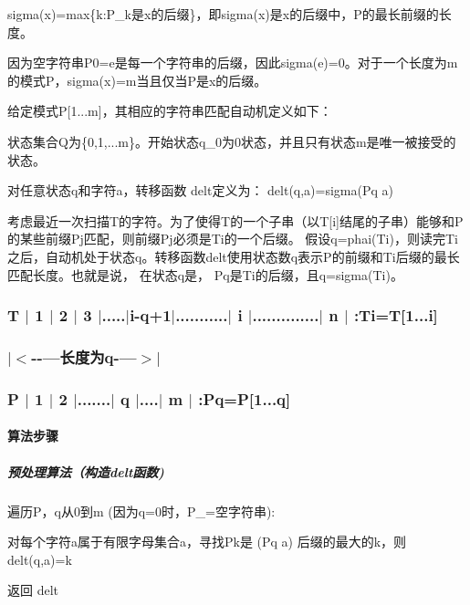 \begin{DoxyItemize}
\item sigma(x)=max\{k\+:P\+\_\+k是x的后缀\}，即sigma(x)是x的后缀中，\+P的最长前缀的长度。
\end{DoxyItemize}

因为空字符串\+P0=e是每一个字符串的后缀，因此sigma(e)=0。对于一个长度为m的模式\+P，sigma(x)=m当且仅当\+P是x的后缀。

给定模式\+P\mbox{[}1...m\mbox{]}，其相应的字符串匹配自动机定义如下：


\begin{DoxyItemize}
\item 状态集合\+Q为\{0,1,...m\}。开始状态q\+\_\+0为0状态，并且只有状态m是唯一被接受的状态。
\item 对任意状态q和字符a，转移函数 delt定义为： delt(q,a)=sigma(\+Pq a)
\end{DoxyItemize}

考虑最近一次扫描\+T的字符。为了使得\+T的一个子串（以\+T\mbox{[}i\mbox{]}结尾的子串）能够和\+P的某些前缀\+Pj匹配，则前缀\+Pj必须是\+Ti的一个后缀。 假设q=phai(\+Ti)，则读完\+Ti之后，自动机处于状态q。转移函数delt使用状态数q表示\+P的前缀和\+Ti后缀的最长匹配长度。也就是说， 在状态q是， Pq是\+Ti的后缀，且q=sigma(\+Ti)。 

 \subsubsection*{T $\vert$ 1 $\vert$ 2 $\vert$ 3 $\vert$.....$\vert$i-\/q+1$\vert$...........$\vert$ i $\vert$..............$\vert$ n $\vert$ \+:Ti=T\mbox{[}1...i\mbox{]} }

\subsubsection*{$\vert$$<$-\/-\/---长度为q-\/---$>$$\vert$ }

\subsubsection*{P $\vert$ 1 $\vert$ 2 $\vert$.......$\vert$ q $\vert$....$\vert$ m $\vert$ \+:Pq=P\mbox{[}1...q\mbox{]} }

\paragraph*{算法步骤}

\subparagraph*{预处理算法（构造delt函数)}


\begin{DoxyItemize}
\item 遍历\+P，q从0到m (因为q=0时，\+P\+\_=空字符串)\+:
\begin{DoxyItemize}
\item 对每个字符a属于有限字母集合a，寻找\+Pk是 (Pq a) 后缀的最大的k，则 delt(q,a)=k
\end{DoxyItemize}
\item 返回 delt
\end{DoxyItemize}

